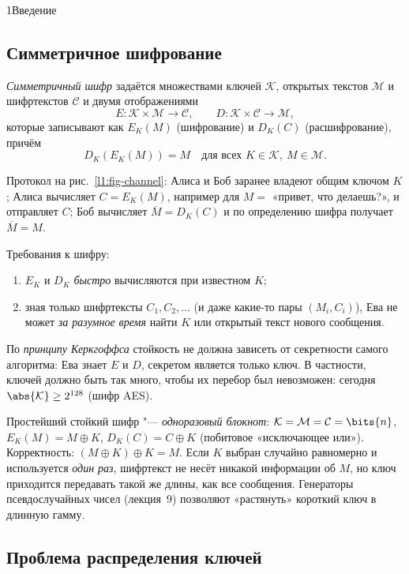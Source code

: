 \begin{lecture}{1}{Введение}
\subsection{Симметричное шифрование}

\begin{definition}\label{l1:cipher}
\emph{Симметричный шифр} задаётся множествами ключей $\mathcal K$, открытых текстов
$\mathcal M$ и шифртекстов $\mathcal C$ и двумя отображениями
\[
  E\colon \mathcal K \times \mathcal M \to \mathcal C, \qquad
  D\colon \mathcal K \times \mathcal C \to \mathcal M,
\]
которые записывают как $E_K(M)$ (шифрование) и $D_K(C)$ (расшифрование), причём
\[
  D_K(E_K(M)) = M \quad \text{для всех } K \in \mathcal K,\ M \in \mathcal M.
\]
\end{definition}

Протокол на рис.~\ref{l1:fig-channel}: Алиса и Боб заранее владеют общим ключом $K$; Алиса
вычисляет $C = E_K(M)$, например для $M = $ «привет, что делаешь?», и отправляет $C$; Боб
вычисляет $\overline M = D_K(C)$ и по определению шифра получает $\overline M = M$.

Требования к шифру:
\begin{enumerate}
  \item $E_K$ и $D_K$ \emph{быстро} вычисляются при известном $K$;
  \item зная только шифртексты $C_1, C_2, \dots$ (и даже какие-то пары $(M_i, C_i)$), Ева не
    может \emph{за разумное время} найти $K$ или открытый текст нового сообщения.
\end{enumerate}
По \emph{принципу Керкгоффса} стойкость не должна зависеть от секретности самого алгоритма:
Ева знает $E$ и $D$, секретом является только ключ. В частности, ключей должно быть так много,
чтобы их перебор был невозможен: сегодня $\abs{\mathcal K} \ge 2^{128}$ (шифр AES).

\begin{example}
Простейший стойкий шифр "--- \emph{одноразовый блокнот}: $\mathcal K = \mathcal M =
\mathcal C = \bits{n}$, $E_K(M) = M \oplus K$, $D_K(C) = C \oplus K$ (побитовое
«исключающее или»). Корректность: $(M \oplus K) \oplus K = M$. Если $K$ выбран случайно
равномерно и используется \emph{один раз}, шифртекст не несёт никакой информации об $M$, но
ключ приходится передавать такой же длины, как все сообщения. Генераторы псевдослучайных
чисел (лекция~9) позволяют «растянуть» короткий ключ в длинную гамму.
\end{example}

\subsection{Проблема распределения ключей}


\end{lecture}
